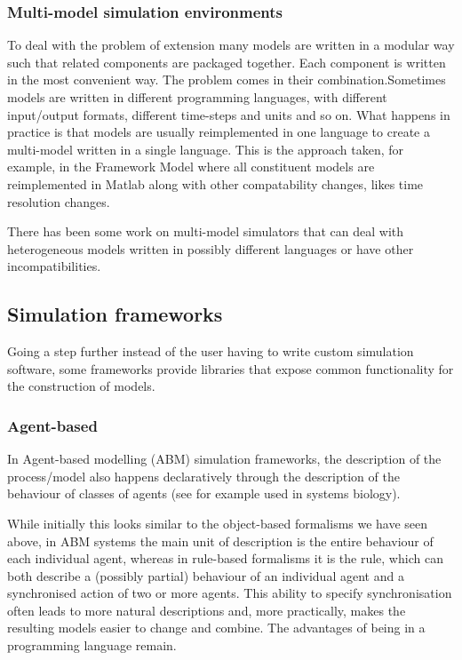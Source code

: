 \documentclass[phd]{infthesis}
\begin{document}
\subsubsection{Multi-model simulation environments}
To deal with the problem of extension many models are written in a modular way
such that related components are packaged together. Each component is written in
the most convenient way. The problem comes in their combination.Sometimes models
are written in different programming languages, with different input/output
formats, different time-steps and units and so on. What happens in practice is
that models are usually reimplemented in one language to create a multi-model
written in a single language. This is the approach taken, for example, in the
Framework Model where all constituent models are reimplemented in Matlab along
with other compatability changes, likes time resolution changes.

There has been some work on multi-model simulators that can deal with
heterogeneous models written in possibly different languages or have other
incompatibilities.


\subsection{Simulation frameworks}
Going a step further instead of the user having to write custom simulation
software, some frameworks provide libraries that expose common functionality for
the construction of models.

\subsubsection*{Agent-based}
In Agent-based modelling (ABM) simulation frameworks, the description of the
process/model also happens declaratively through the description of the
behaviour of classes of agents (see for example \cite{solovyev2010spark} used in
systems biology). 

While initially this looks similar to the object-based formalisms we have seen
above, in ABM systems the main unit of description is the entire behaviour of
each individual agent, whereas in rule-based formalisms it is the rule, which
can both describe a (possibly partial) behaviour of an individual agent and a
synchronised action of two or more agents. This ability to specify
synchronisation often leads to more natural descriptions and, more practically,
makes the resulting models easier to change and combine. The advantages of being
in a programming language remain.
\end{document}
